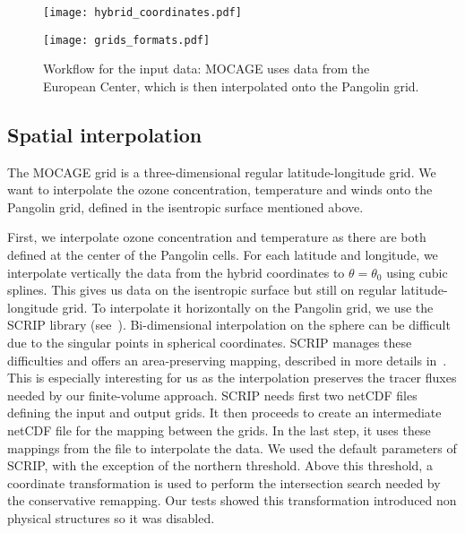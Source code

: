 \begin{figure}
  \begin{minipage}[t]{0.49\linewidth}
    \centering
    \texttt{[image: hybrid\_coordinates.pdf]}
    \caption{Hybrid coordinates of MOCAGE at latitude=-41\degree as a function of
      longitude. For readability purposes, not all levels are shown here (roughly
    one over two). The largest peak corresponds to the Andes mountains.}
\label{fig:hybrid}
  \end{minipage}
  \hfill
  \begin{minipage}[t]{0.45\linewidth}
    \centering
    \texttt{[image: grids\_formats.pdf]}
    \caption{Workflow for the input data: MOCAGE uses data from the European Center,
    which is then interpolated onto the Pangolin grid.}
\label{fig:grids_formats}
  \end{minipage}
\end{figure}
%

\subsection{Spatial interpolation}
\label{subsec:spatial_interp}
The MOCAGE grid is a three-dimensional regular latitude-longitude grid. We want
to interpolate the ozone concentration, temperature and winds onto the Pangolin
grid, defined in the isentropic surface mentioned above. 

First, we interpolate ozone concentration and temperature as there are both
defined at the center of the Pangolin cells. For each latitude and longitude,
we interpolate vertically the data from the hybrid coordinates to
$\theta=\theta_0$ using cubic splines.  This gives us data on the isentropic
surface but still on regular latitude-longitude grid. To interpolate it
horizontally on the Pangolin grid, we use the SCRIP library
(see~\cite{Jones1997}). Bi-dimensional interpolation on the sphere can be
difficult due to the singular points in spherical coordinates.  SCRIP manages
these difficulties and offers an area-preserving mapping, described in more
details in~\cite{Jones1999}. This is especially interesting for us as the
interpolation preserves the tracer fluxes needed by our finite-volume approach.
SCRIP needs first two netCDF files defining the input and output grids. It then
proceeds to create an intermediate netCDF file for the mapping between the
grids. In the last step, it uses these mappings from the file to interpolate the
data. We used the default parameters of SCRIP, with the exception of the
northern threshold. Above this threshold, a coordinate transformation is used to
perform the intersection search needed by the conservative remapping. Our tests
showed this transformation introduced non physical structures so it was
disabled.

